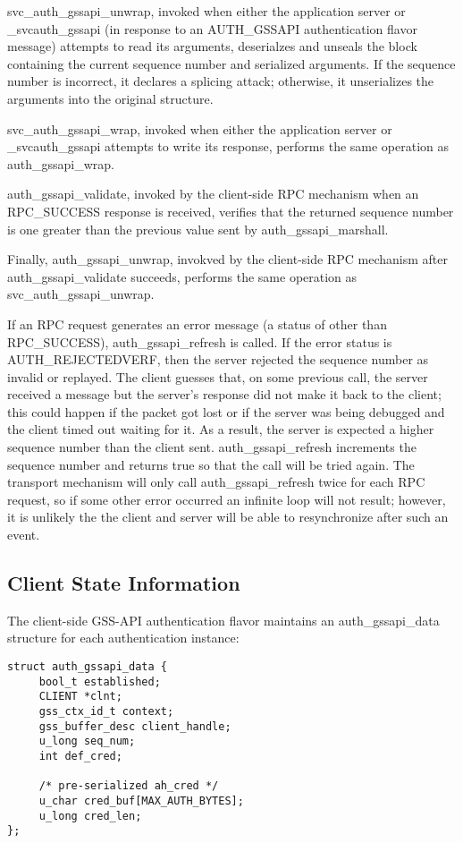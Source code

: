 svc_auth_gssapi_unwrap, invoked when either the application server or
_svcauth_gssapi (in response to an AUTH_GSSAPI authentication flavor
message) attempts to read its arguments, deserialzes and unseals the
block containing the current sequence number and serialized arguments.
If the sequence number is incorrect, it declares a splicing attack;
otherwise, it unserializes the arguments into the original structure.

svc_auth_gssapi_wrap, invoked when either the application server or
_svcauth_gssapi attempts to write its response, performs the same
operation as auth_gssapi_wrap.

auth_gssapi_validate, invoked by the client-side RPC mechanism when
an RPC_SUCCESS response is received, verifies that the returned sequence
number is one greater than the previous value sent by
auth_gssapi_marshall.

Finally, auth_gssapi_unwrap, invokved by the client-side RPC mechanism
after auth_gssapi_validate succeeds, performs the same operation as
svc_auth_gssapi_unwrap.

If an RPC request generates an error message (a status of other than
RPC_SUCCESS), auth_gssapi_refresh is called.  If the error status is
AUTH_REJECTEDVERF, then the server rejected the sequence number as
invalid or replayed.  The client guesses that, on some previous call,
the server received a message but the server's response did not make
it back to the client; this could happen if the packet got lost or if
the server was being debugged and the client timed out waiting for it.
As a result, the server is expected a higher sequence number than the
client sent.  auth_gssapi_refresh increments the sequence number and
returns true so that the call will be tried again.  The transport
mechanism will only call auth_gssapi_refresh twice for each RPC
request, so if some other error occurred an infinite loop will not
result; however, it is unlikely the the client and server will be able
to resynchronize after such an event.

\subsection{Client State Information}

The client-side GSS-API authentication flavor maintains an
auth_gssapi_data structure for each authentication instance:

\begin{verbatim}
struct auth_gssapi_data {
     bool_t established;
     CLIENT *clnt;
     gss_ctx_id_t context;
     gss_buffer_desc client_handle;
     u_long seq_num;
     int def_cred;

     /* pre-serialized ah_cred */
     u_char cred_buf[MAX_AUTH_BYTES];
     u_long cred_len;
};
\end{verbatim}

